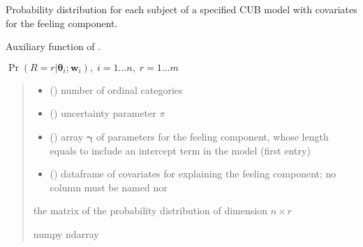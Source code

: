 \documentclass[letterpaper,10pt,english]{sphinxmanual}
\begin{document}

\begin{fulllineitems}
\label{\detokenize{cubmods:cubmods.cub_0w.pmfi}}
\pysigstartsignatures
{}
\pysigstopsignatures
\sphinxAtStartPar
Probability distribution for each subject of a specified CUB model 
with covariates for the feeling component.

\sphinxAtStartPar
Auxiliary function of .

\sphinxAtStartPar
\(\Pr(R = r | \pmb\theta_i ; \pmb w_i),\; i=1 \ldots n ,\; r=1 \ldots m\)
\begin{quote}\begin{description}
\begin{itemize}
\item {} 
\sphinxAtStartPar
{} () \textendash{} number of ordinal categories

\item {} 
\sphinxAtStartPar
{} () \textendash{} uncertainty parameter \(\pi\)

\item {} 
\sphinxAtStartPar
{} () \textendash{} array \(\pmb \gamma\) of parameters for the feeling component, whose length equals 
 to include an intercept term in the model (first entry)

\item {} 
\sphinxAtStartPar
{} () \textendash{} dataframe of covariates for explaining the feeling component;
no column must be named  nor 

\end{itemize}

\sphinxAtStartPar
the matrix of the probability distribution of dimension \(n \times r\)

\sphinxAtStartPar
numpy ndarray

\end{description}\end{quote}

\end{fulllineitems}
\end{document}
